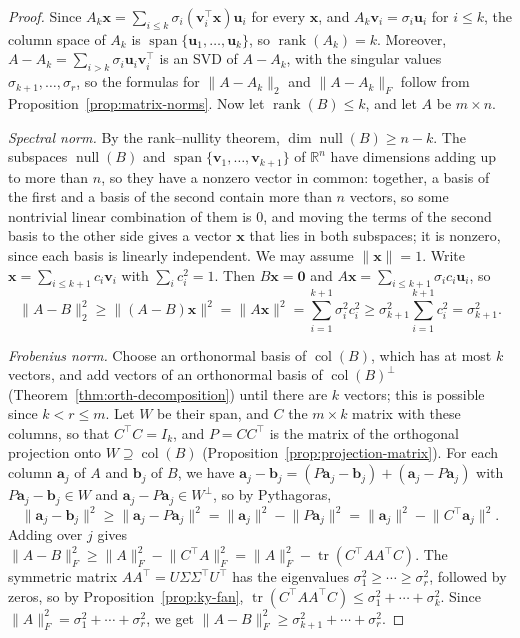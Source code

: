 \documentclass[11pt]{article}
\newcommand{\norm}[1]{\lVert #1 \rVert}
\theoremstyle{definition}
\theoremstyle{plain}
\theoremstyle{remark}
\DeclareMathOperator{\rank}{rank}
\DeclareMathOperator{\Null}{null}
\DeclareMathOperator{\col}{col}
\DeclareMathOperator{\Span}{span}
\DeclareMathOperator{\tr}{tr}
\begin{document}
\begin{proof}
    Since $A_k\mathbf{x} = \sum_{i \leq k} \sigma_i (\mathbf{v}_i^\top \mathbf{x}) \mathbf{u}_i$ for every $\mathbf{x}$, and $A_k\mathbf{v}_i = \sigma_i \mathbf{u}_i$ for $i \leq k$, the column space of $A_k$ is $\Span\{\mathbf{u}_1, \ldots, \mathbf{u}_k\}$, so $\rank(A_k) = k$. Moreover, $A - A_k = \sum_{i > k} \sigma_i \mathbf{u}_i \mathbf{v}_i^\top$ is an SVD of $A - A_k$, with the singular values $\sigma_{k+1}, \ldots, \sigma_r$, so the formulas for $\norm{A - A_k}_2$ and $\norm{A - A_k}_F$ follow from Proposition~\ref{prop:matrix-norms}. Now let $\rank(B) \leq k$, and let $A$ be $m \times n$.

    \emph{Spectral norm.} By the rank--nullity theorem, $\dim\Null(B) \geq n - k$. The subspaces $\Null(B)$ and $\Span\{\mathbf{v}_1, \ldots, \mathbf{v}_{k+1}\}$ of $\mathbb{R}^n$ have dimensions adding up to more than $n$, so they have a nonzero vector in common: together, a basis of the first and a basis of the second contain more than $n$ vectors, so some nontrivial linear combination of them is $0$, and moving the terms of the second basis to the other side gives a vector $\mathbf{x}$ that lies in both subspaces; it is nonzero, since each basis is linearly independent. We may assume $\norm{\mathbf{x}} = 1$. Write $\mathbf{x} = \sum_{i \leq k+1} c_i \mathbf{v}_i$ with $\sum_i c_i^2 = 1$. Then $B\mathbf{x} = \mathbf{0}$ and $A\mathbf{x} = \sum_{i \leq k+1} \sigma_i c_i \mathbf{u}_i$, so
    \[\norm{A - B}_2^2 \geq \norm{(A - B)\mathbf{x}}^2 = \norm{A\mathbf{x}}^2 = \sum_{i=1}^{k+1} \sigma_i^2 c_i^2 \geq \sigma_{k+1}^2 \sum_{i=1}^{k+1} c_i^2 = \sigma_{k+1}^2.\]

    \emph{Frobenius norm.} Choose an orthonormal basis of $\col(B)$, which has at most $k$ vectors, and add vectors of an orthonormal basis of $\col(B)^\perp$ (Theorem~\ref{thm:orth-decomposition}) until there are $k$ vectors; this is possible since $k < r \leq m$. Let $W$ be their span, and $C$ the $m \times k$ matrix with these columns, so that $C^\top C = I_k$, and $P = CC^\top$ is the matrix of the orthogonal projection onto $W \supseteq \col(B)$ (Proposition~\ref{prop:projection-matrix}). For each column $\mathbf{a}_j$ of $A$ and $\mathbf{b}_j$ of $B$, we have $\mathbf{a}_j - \mathbf{b}_j = (P\mathbf{a}_j - \mathbf{b}_j) + (\mathbf{a}_j - P\mathbf{a}_j)$ with $P\mathbf{a}_j - \mathbf{b}_j \in W$ and $\mathbf{a}_j - P\mathbf{a}_j \in W^\perp$, so by Pythagoras,
    \[\norm{\mathbf{a}_j - \mathbf{b}_j}^2 \geq \norm{\mathbf{a}_j - P\mathbf{a}_j}^2 = \norm{\mathbf{a}_j}^2 - \norm{P\mathbf{a}_j}^2 = \norm{\mathbf{a}_j}^2 - \norm{C^\top \mathbf{a}_j}^2.\]
    Adding over $j$ gives $\norm{A - B}_F^2 \geq \norm{A}_F^2 - \norm{C^\top A}_F^2 = \norm{A}_F^2 - \tr(C^\top AA^\top C)$. The symmetric matrix $AA^\top = U\Sigma\Sigma^\top U^\top$ has the eigenvalues $\sigma_1^2 \geq \cdots \geq \sigma_r^2$, followed by zeros, so by Proposition~\ref{prop:ky-fan}, $\tr(C^\top AA^\top C) \leq \sigma_1^2 + \cdots + \sigma_k^2$. Since $\norm{A}_F^2 = \sigma_1^2 + \cdots + \sigma_r^2$, we get $\norm{A - B}_F^2 \geq \sigma_{k+1}^2 + \cdots + \sigma_r^2$.
\end{proof}
\end{document}
